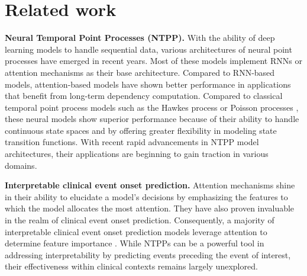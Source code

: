 \section{Related work}
\textbf{Neural Temporal Point Processes (NTPP).} With the ability of deep learning models to handle sequential data, various architectures of neural point processes have emerged in recent years. Most of these models implement RNNs \cite{MeiRNN,FullyNN,Intensityfree,DuRNN} or attention mechanisms \cite{ZuoTHP,Zhangsahp,YangAttNHP} as their base architecture. Compared to RNN-based models, attention-based models have shown better performance in applications that benefit from long-term dependency computation. Compared to classical temporal point process models such as the Hawkes process \cite{classicalhawkestpp} or Poisson processes \cite{classicalpoisontpp}, these neural models show superior performance because of their ability to handle continuous state spaces and by offering greater flexibility in modeling state transition functions. With recent rapid advancements in NTPP model architectures, their applications are beginning to gain traction in various domains.

\vspace{10pt}

\noindent\textbf{Interpretable clinical event onset prediction.} Attention mechanisms \cite{attentionisallyouneed} shine in their ability to elucidate a model's decisions by emphasizing the features to which the model allocates the most attention. They have also proven invaluable in the realm of clinical event onset prediction. Consequently, a majority of interpretable clinical event onset prediction models leverage attention to determine feature importance \cite{int1,int2,int3,int4,int5}. While NTPPs can be a powerful tool in addressing interpretability by predicting events preceding the event of interest, their effectiveness within clinical contexts remains largely unexplored.